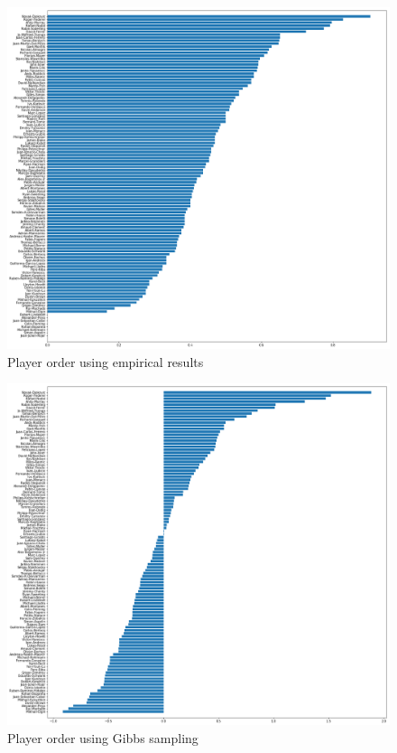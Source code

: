 \documentclass[twoside,twocolumn]{article}
\begin{document}
\begin{figure}[h]
  \centering
    \includegraphics[width=\linewidth]{e_1}
  \caption{Player order using empirical results }
  \label{fig:e_1}
\end{figure}

\begin{figure}[h]
  \centering
    \includegraphics[width=\linewidth]{e_3}
  \caption{Player order using Gibbs sampling }
  \label{fig:e_2}
\end{figure}
\end{document}
